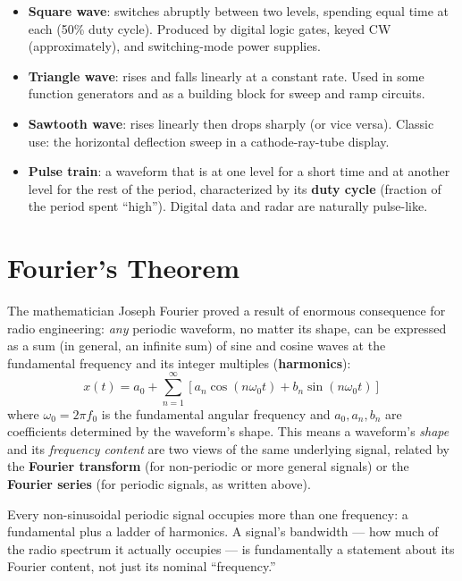 \begin{itemize}
\item \textbf{Square wave}: switches abruptly between two levels, spending
equal time at each (50\% duty cycle). Produced by digital logic gates,
keyed CW (approximately), and switching-mode power supplies.
\item \textbf{Triangle wave}: rises and falls linearly at a constant
rate. Used in some function generators and as a building block for
sweep and ramp circuits.
\item \textbf{Sawtooth wave}: rises linearly then drops sharply (or vice
versa). Classic use: the horizontal deflection sweep in a
cathode-ray-tube display.
\item \textbf{Pulse train}: a waveform that is at one level for a short
time and at another level for the rest of the period, characterized by
its \textbf{duty cycle} (fraction of the period spent ``high''). Digital
data and radar are naturally pulse-like.
\end{itemize}

\section{Fourier's Theorem}
\label{sec:fourier}

The mathematician Joseph Fourier proved a result of enormous consequence
for radio engineering: \emph{any} periodic waveform, no matter its shape,
can be expressed as a sum (in general, an infinite sum) of sine and
cosine waves at the fundamental frequency and its integer multiples
(\textbf{harmonics}):
\[
x(t) = a_0 + \sum_{n=1}^{\infty} \left[a_n \cos(n\omega_0 t) + b_n \sin(n\omega_0 t)\right]
\]
where $\omega_0 = 2\pi f_0$ is the fundamental angular frequency and
$a_0, a_n, b_n$ are coefficients determined by the waveform's shape. This
means a waveform's \emph{shape} and its \emph{frequency content} are two
views of the same underlying signal, related by the \textbf{Fourier
transform} (for non-periodic or more general signals) or the
\textbf{Fourier series} (for periodic signals, as written above).

\begin{keyidea}
Every non-sinusoidal periodic signal occupies more than one frequency: a
fundamental plus a ladder of harmonics. A signal's bandwidth --- how much
of the radio spectrum it actually occupies --- is fundamentally a
statement about its Fourier content, not just its nominal ``frequency.''
\end{keyidea}


